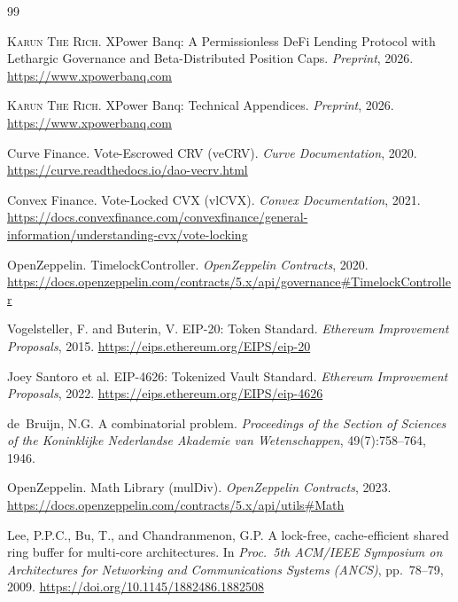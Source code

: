 \documentclass[10pt,a4paper,twocolumn]{article}
\theoremstyle{definition}
\theoremstyle{plain}
\theoremstyle{remark}
\begin{document}
\begin{thebibliography}{99}

\textsc{Karun The Rich}.
\newblock XPower Banq: A Permissionless DeFi Lending Protocol with Lethargic Governance and Beta-Distributed Position Caps.
\newblock \emph{Preprint}, 2026.
\newblock \url{https://www.xpowerbanq.com}

\textsc{Karun The Rich}.
\newblock XPower Banq: Technical Appendices.
\newblock \emph{Preprint}, 2026.
\newblock \url{https://www.xpowerbanq.com}

Curve Finance.
\newblock Vote-Escrowed CRV (veCRV).
\newblock \emph{Curve Documentation}, 2020.
\newblock \url{https://curve.readthedocs.io/dao-vecrv.html}

Convex Finance.
\newblock Vote-Locked CVX (vlCVX).
\newblock \emph{Convex Documentation}, 2021.
\newblock \url{https://docs.convexfinance.com/convexfinance/general-information/understanding-cvx/vote-locking}

OpenZeppelin.
\newblock TimelockController.
\newblock \emph{OpenZeppelin Contracts}, 2020.
\newblock \url{https://docs.openzeppelin.com/contracts/5.x/api/governance#TimelockController}

Vogelsteller, F. and Buterin, V.
\newblock EIP-20: Token Standard.
\newblock \emph{Ethereum Improvement Proposals}, 2015.
\newblock \url{https://eips.ethereum.org/EIPS/eip-20}

Joey Santoro et al.
\newblock EIP-4626: Tokenized Vault Standard.
\newblock \emph{Ethereum Improvement Proposals}, 2022.
\newblock \url{https://eips.ethereum.org/EIPS/eip-4626}

de~Bruijn, N.G.
\newblock A combinatorial problem.
\newblock \emph{Proceedings of the Section of Sciences of the Koninklijke Nederlandse Akademie van Wetenschappen}, 49(7):758--764, 1946.

OpenZeppelin.
\newblock Math Library (mulDiv).
\newblock \emph{OpenZeppelin Contracts}, 2023.
\newblock \url{https://docs.openzeppelin.com/contracts/5.x/api/utils#Math}

Lee, P.P.C., Bu, T., and Chandranmenon, G.P.
\newblock A lock-free, cache-efficient shared ring buffer for multi-core architectures.
\newblock In \emph{Proc.\ 5th ACM/IEEE Symposium on Architectures for Networking and Communications Systems (ANCS)}, pp.\ 78--79, 2009.
\newblock \url{https://doi.org/10.1145/1882486.1882508}

\end{thebibliography}
\end{document}
